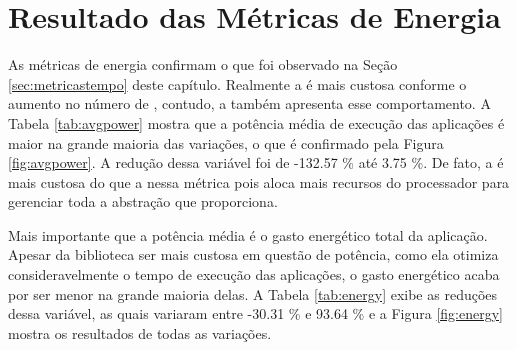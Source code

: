 \clearpage

\section{Resultado das Métricas de Energia}
\label{sec:metricasenergia}

As métricas de energia confirmam o que foi observado na Seção \ref{sec:metricastempo} deste capítulo. Realmente a \API \ASYNC é mais custosa conforme o aumento no número de \clusters, contudo, a \IPC também apresenta esse comportamento. A Tabela \ref{tab:avgpower} mostra que a potência média de execução das aplicações é maior na grande maioria das variações, o que é confirmado pela Figura \ref{fig:avgpower}. A redução dessa variável foi de -132.57 \% até 3.75 \%. De fato, a \ASYNC é mais custosa do que a \IPC nessa métrica pois aloca mais recursos do processador para gerenciar toda a abstração que proporciona.

\begin{table}[h]
\centering
\caption{Reduções ao comparar-se a potência média durante execução.}
\label{tab:avgpower}
\end{table}

Mais importante que a potência média é o gasto energético total da aplicação. Apesar da biblioteca \ASYNC ser mais custosa em questão de potência, como ela otimiza consideravelmente o tempo de execução das aplicações, o gasto energético acaba por ser menor na grande maioria delas. A Tabela \ref{tab:energy} exibe as reduções dessa variável, as quais variaram entre -30.31 \% e 93.64 \% e a Figura \ref{fig:energy} mostra os resultados de todas as variações.

